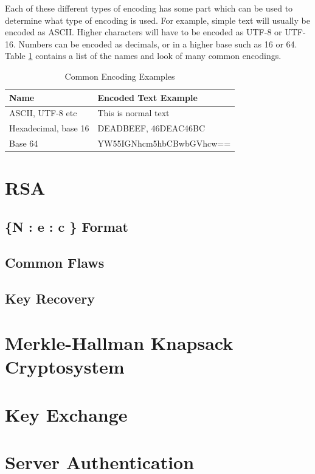 \documentclass[a4paper,11pt]{report}
\begin{document}
				Each of these different types of encoding has some part which can be used to determine what type of encoding is used. 
				For example, simple text will usually be encoded as ASCII. 
				Higher characters will have to be encoded as UTF-8 or UTF-16. 
				Numbers can be encoded as decimals, or in a higher base such as 16 or 64. 
				Table \ref{tab:Encodings} contains a list of the names and look of many common encodings. 
				\begin{table}[htb]
					\centering
					\begin{tabular}{| l | l |}
						\hline
						\textbf{Name} & \textbf{Encoded Text Example} \\ \hline
						ASCII, UTF-8 etc & This is normal text \\ \hline
						Hexadecimal, base 16 & DEADBEEF, 46DEAC46BC \\ \hline
						Base 64 & YW55IGNhcm5hbCBwbGVhcw== \\ \hline
					\end{tabular}
					\caption{Common Encoding Examples}
					\label{tab:Encodings}
				\end{table}
	\section{RSA}
		
		\subsection{\{N : e : c \} Format}
		\subsection{Common Flaws}
		\subsection{Key Recovery}
	\section{Merkle-Hallman Knapsack Cryptosystem}
	\section{Key Exchange}
	\section{Server Authentication}
\end{document}
